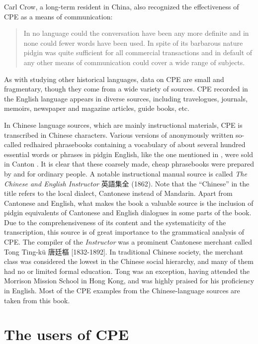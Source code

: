 \documentclass[output=paper]{langsci/langscibook}
\begin{document}
Carl Crow, a long-term resident in China, also recognized the effectiveness of CPE as a means of communication:

\begin{quote}
    In no language could the conversation have been any more definite and in none could fewer words have been used. In spite of its barbarous nature pidgin was quite sufficient for all commercial transactions and in default of any other means of communication could cover a wide range of subjects. \citep[31]{crow_foreign_2011}
\end{quote}

As with studying other historical languages, data on CPE are small and fragmentary, though they come from a wide variety of sources. CPE recorded in the English language appears in diverse sources, including travelogues, journals, memoirs, newspaper and magazine articles, guide books, etc.

In Chinese language sources, which are mainly instructional materials, CPE is transcribed in Chinese characters. Various versions of anonymously written so-called redhaired phrasebooks containing a vocabulary of about several hundred essential words or phrases in pidgin English, like the one mentioned in \citet{hunter_fan_1882}, were sold in Canton \citep{bolton_chinese_2003}. It is clear that these coarsely made, cheap phrasebooks were prepared by and for ordinary people. A notable instructional manual source is called \textit{The Chinese and English Instructor} {\cjkfont 英語集全} (1862). Note that the “Chinese” in the title refers to the local dialect, Cantonese instead of Mandarin. Apart from Cantonese and English, what makes the book a valuable source is the inclusion of pidgin equivalents of Cantonese and English dialogues in some parts of the book. Due to the comprehensiveness of its content and the systematicity of the transcription, this source is of great importance to the grammatical analysis of CPE. The compiler of the \textit{Instructor} was a prominent Cantonese merchant called Tong Ting-kü {\cjkfont 唐廷樞} [1832-1892]. In traditional Chinese society, the merchant class was considered the lowest in the Chinese social hierarchy, and many of them had no or limited formal education. Tong was an exception, having attended the Morrison Mission School in Hong Kong, and was highly praised for his proficiency in English. Most of the CPE examples from the Chinese-language sources are taken from this book.

\section{The users of CPE}
\end{document}
